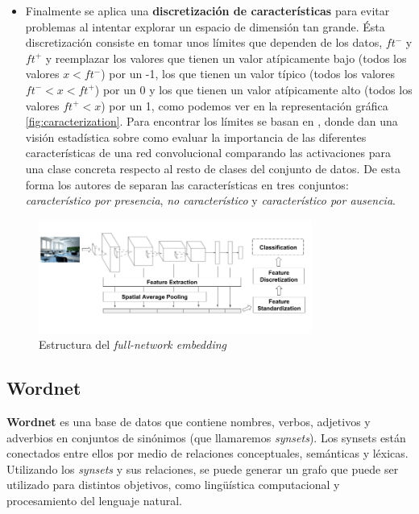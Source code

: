 \documentclass[12,twoside]{TFG-GM}
\theoremstyle{definition}
\theoremstyle{remark}
\begin{document}
\begin{itemize}
\item Finalmente se aplica una \textbf{discretización de características} para evitar problemas al intentar explorar un espacio de dimensión tan grande. Ésta discretización consiste en tomar unos límites que dependen de los datos, $ft^-$ y $ft^+$ y reemplazar los valores que tienen un valor atípicamente bajo (todos los valores $x < ft^-$) por un -1, los que tienen un valor típico (todos los valores $ ft^- < x < ft^+$) por un 0 y los que tienen un valor atípicamente alto (todos los valores $ ft^+ < x$) por un 1, como podemos ver en la representación gráfica \ref{fig:caracterization}. Para encontrar los límites se basan en \cite{behaviourcnn}, donde dan una visión estadística sobre como evaluar la importancia de las diferentes características de una red convolucional comparando las activaciones para una clase concreta respecto al resto de clases del conjunto de datos. De esta forma los autores de \cite{behaviourcnn} separan las características en tres conjuntos: \textit{característico por presencia}, \textit{no característico} y \textit{característico por ausencia}.

\end{itemize}
\begin{figure}[h]
\label{fig:fne}
\centering
\includegraphics[width = 0.8\textwidth]{Images/cropfne.png} 
\caption{Estructura del \textit{full-network embedding}}
\end{figure}




\subsection{Wordnet}

\textbf{Wordnet} es una base de datos que contiene nombres, verbos, adjetivos y adverbios en conjuntos de sinónimos (que llamaremos \textit{synsets}). Los synsets están conectados entre ellos por medio de relaciones conceptuales, semánticas y léxicas. Utilizando los \textit{synsets} y sus relaciones, se puede generar un grafo que puede ser utilizado para distintos objetivos, como lingüística computacional y procesamiento del lenguaje natural. 
\end{document}
